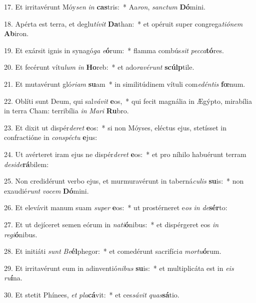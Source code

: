 17. Et irritavérunt Móy\textit{sen} \textit{in} \textbf{cas}tris:~*  Aa\textit{ron}, \textit{sanc}\textit{tum} \textbf{Dó}mini.\

18. Apérta est terra, et deglu\textit{tí}\textit{vit} \textbf{Da}than:~*  et opéruit super congrega\textit{ti}\textit{ó}\textit{nem} \textbf{Ab}iron.\

19. Et exársit ignis in synagó\textit{ga} \textit{e}\textbf{ó}rum:~*  flamma combús\textit{sit} \textit{pec}\textit{ca}\textbf{tó}res.\

20. Et fecérunt vítu\textit{lum} \textit{in} \textbf{Ho}reb:~*  et ado\textit{ra}\textit{vé}\textit{runt} \textbf{scúlp}tile.\

21. Et mutavérunt gló\textit{ri}\textit{am} \textbf{su}am~*  in similitúdinem vítuli com\textit{e}\textit{dén}\textit{tis} \textbf{fœ}num.\

22. Oblíti sunt Deum, qui sal\textit{vá}\textit{vit} \textbf{e}os,~*  qui fecit magnália in Ægýpto, mirabília in terra Cham: terribília \textit{in} \textit{Ma}\textit{ri} \textbf{Ru}bro.\

23. Et dixit ut dispér\textit{de}\textit{ret} \textbf{e}os:~*  si non Móyses, eléctus ejus, stetísset in confractióne in \textit{con}\textit{spéc}\textit{tu} \textbf{e}jus:\

24. Ut avérteret iram ejus ne dispér\textit{de}\textit{ret} \textbf{e}os:~*  et pro níhilo habuérunt terram \textit{de}\textit{si}\textit{de}\textbf{rá}bilem:\

25. Non credidérunt verbo ejus, et murmuravérunt in taberná\textit{cu}\textit{lis} \textbf{su}is:~*  non exaudié\textit{runt} \textit{vo}\textit{cem} \textbf{Dó}mini.\

26. Et elevávit manum suam \textit{su}\textit{per} \textbf{e}os:~*  ut prostérneret e\textit{os} \textit{in} \textit{de}\textbf{sér}to:\

27. Et ut dejíceret semen eórum in \textit{na}\textit{ti}\textbf{ó}nibus:~*  et dispérgeret eos \textit{in} \textit{re}\textit{gi}\textbf{ó}nibus.\

28. Et initiáti \textit{sunt} \textit{Be}\textbf{él}phegor:~*  et comedérunt sacrifíci\textit{a} \textit{mor}\textit{tu}\textbf{ó}rum.\

29. Et irritavérunt eum in adinventió\textit{ni}\textit{bus} \textbf{su}is:~*  et multiplicáta est in \textit{e}\textit{is} \textit{ru}\textbf{í}na.\

30. Et stetit Phínees, \textit{et} \textit{pla}\textbf{cá}vit:~*  et ces\textit{sá}\textit{vit} \textit{quas}\textbf{sá}tio.\

